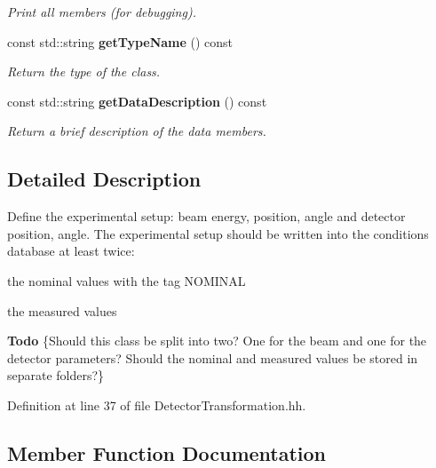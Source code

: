 \begin{DoxyCompactItemize}
\begin{DoxyCompactList}\small\item\em Print all members (for debugging). \item\end{DoxyCompactList}\item 
const std::string {\bf getTypeName} () const \label{classCALICE_1_1DetectorTransformation_a32750bb0d4ebc5fe3a62871a4b6a427a}

\begin{DoxyCompactList}\small\item\em Return the type of the class. \item\end{DoxyCompactList}\item 
const std::string {\bf getDataDescription} () const \label{classCALICE_1_1DetectorTransformation_a5c2acba9e28ad26da43444e39bc220a7}

\begin{DoxyCompactList}\small\item\em Return a brief description of the data members. \item\end{DoxyCompactList}\end{DoxyCompactItemize}


\subsection{Detailed Description}
Define the experimental setup: beam energy, position, angle and detector position, angle. The experimental setup should be written into the conditions database at least twice: 
\begin{DoxyItemize}
\item the nominal values with the tag NOMINAL 
\item the measured values 
\end{DoxyItemize}\begin{Desc}
\item[{\bf Todo}]\{Should this class be split into two? One for the beam and one for the detector parameters? Should the nominal and measured values be stored in separate folders?\} \end{Desc}


Definition at line 37 of file DetectorTransformation.hh.

\subsection{Member Function Documentation}
